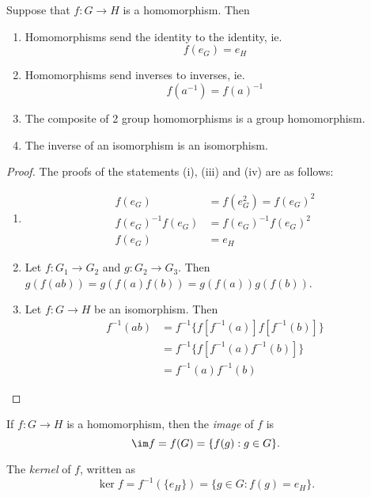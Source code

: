 \documentclass[a4paper]{article}
\begin{document}
  \begin{prop}
    Suppose that $f: G\rightarrow H$ is a homomorphism. Then
    \begin{enumerate}
      \item Homomorphisms send the identity to the identity, ie.
        \[
          f(e_G) = e_H
        \]
      \item Homomorphisms send inverses to inverses, ie.
        \[
          f(a^{-1}) = f(a)^{-1}
        \]
      \item The composite of 2 group homomorphisms is a group homomorphism.
      \item The inverse of an isomorphism is an isomorphism.
    \end{enumerate}
  \end{prop}
  \begin{proof}
    The proofs of the statements (i), (iii) and (iv) are as follows:
    \begin{enumerate}
      \item \begin{align*}
          f(e_G) &= f(e_G^2) = f(e_G)^2\\
          f(e_G)^{-1}f(e_G) &= f(e_G)^{-1}f(e_G)^2\\
          f(e_G) &= e_H
        \end{align*}
        \setcounter{enumi}{2}
      \item Let $f:G_1 \rightarrow G_2$ and $g:G_2 \rightarrow G_3$. Then $g(f(ab)) = g(f(a)f(b)) = g(f(a))g(f(b))$.
      \item Let $f:G \rightarrow H$ be an isomorphism. Then
        \begin{align*}
          f^{-1}(ab) &= f^{-1}\{f[f^{-1}(a)]f[f^{-1}(b)]\}\\
          &= f^{-1}\{f[f^{-1}(a)f^{-1}(b)]\}\\
          &= f^{-1}(a)f^{-1}(b)
        \end{align*}
    \end{enumerate}
  \end{proof}

  \begin{defi}
    If $f:G\rightarrow H$ is a homomorphism, then the \emph{image} of $f$ is
    \[
      \im f = f(G) = \{f(g):g\in G\}.
    \]
  \end{defi}

  \begin{defi}
    The \emph{kernel} of $f$, written as
    \[
      \ker f = f^{-1}(\{e_H\}) = \{g\in G:f(g)=e_H\}.
    \]
  \end{defi}
\end{document}
